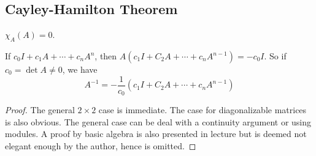 \subsection{Cayley-Hamilton Theorem}
\begin{theorem}
    $\chi_A(A)=0$.
\end{theorem}
\begin{remark}
    If $c_0I+c_1A+\cdots+c_nA^n$, then $A(c_1I+C_2A+\cdots+c_nA^{n-1})=-c_0I$.
    So if $c_0=\det A\neq 0$, we have
    $$A^{-1}=-\frac{1}{c_0}(c_1I+C_2A+\cdots+c_nA^{n-1})$$
\end{remark}
\begin{proof}
    The general $2\times 2$ case is immediate.
    The case for diagonalizable matrices is also obvious.
    The general case can be deal with a continuity argument or using modules.
    A proof by basic algebra is also presented in lecture but is deemed not elegant enough by the author, hence is omitted.
\end{proof}